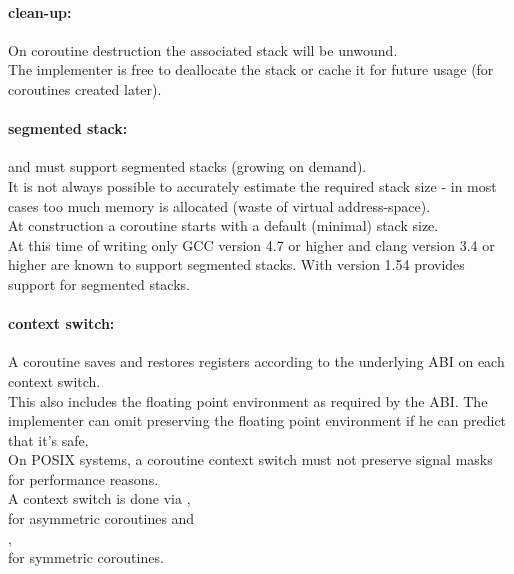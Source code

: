 \paragraph*{clean-up:}
On coroutine destruction the associated stack will be unwound.\\
\newline
The implementer is free to deallocate the stack or cache it for future usage
(for coroutines created later).

\paragraph*{segmented stack:}
\acoro and \scoro must support segmented stacks (growing on demand).\\
\newline
It is not always possible to accurately estimate the required stack size - in
most cases too much memory is allocated (waste of virtual address-space).\\
At construction a coroutine starts with a default (minimal) stack size.\\
At this time of writing only GCC version 4.7 or higher\cite{gccsplit} and
clang version 3.4 or higher are known to support
segmented stacks. With version 1.54 \boostcoroutine provides support for
segmented stacks.\\

\paragraph*{context switch:}
A coroutine saves and restores registers according to the underlying ABI on
each context switch.\\
\newline
This also includes the floating point environment as required by the ABI. The
implementer can omit preserving the floating point environment if he can predict that
it's safe.\\
On POSIX systems, a coroutine context switch must not preserve signal masks for performance
reasons.\\
A context switch is done via \pushcoroop,\\
\pullcoroop for asymmetric coroutines and\\
\callcoroop,\\
\yieldcoroop for symmetric coroutines.

